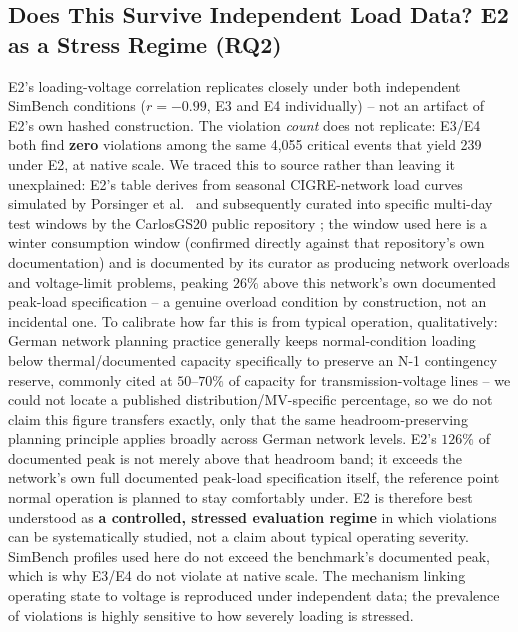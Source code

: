 \documentclass[11pt,conference]{IEEEtran}
\begin{document}
\subsection{Does This Survive Independent Load Data? E2 as a Stress Regime (RQ2)}
\label{sec:e2stress}
E2's loading-voltage correlation replicates closely under both independent SimBench conditions
($r=-0.99$, E3 and E4 individually) -- not an artifact of E2's own hashed construction. The
violation \textit{count} does not replicate: E3/E4 both find \textbf{zero} violations among the same
4,055 critical events that yield 239 under E2, at native scale. We traced this to source rather than
leaving it unexplained: E2's table derives from seasonal CIGRE-network load curves simulated by
Porsinger et al.\ \cite{ref:porsinger2017} and subsequently curated into specific multi-day test
windows by the CarlosGS20 public repository \cite{ref:carlosgs2020}; the window used here is a
winter consumption window (confirmed directly against that repository's own documentation) and is
documented by its curator as producing
network overloads and voltage-limit problems, peaking $26\%$ above this network's own documented
peak-load specification \cite{ref:rudion2006} -- a genuine overload condition by construction, not
an incidental one. To calibrate how far this is from typical operation, qualitatively: German
network planning practice generally keeps normal-condition loading below thermal/documented
capacity specifically to preserve an N-1 contingency reserve, commonly cited at $50$--$70\%$ of
capacity for transmission-voltage lines \cite{ref:kyon_n1} -- we could not locate a published
distribution/MV-specific percentage, so we do not claim this figure transfers exactly, only that the
same headroom-preserving planning principle applies broadly across German network levels. E2's
$126\%$ of documented peak is not merely above that headroom band; it exceeds the network's own
full documented peak-load specification itself, the reference point normal operation is planned to
stay comfortably under. E2 is therefore best understood as \textbf{a controlled, stressed evaluation
regime} in which violations can be systematically studied, not a claim about typical operating
severity. %
SimBench profiles used here do not exceed the benchmark's documented peak, which is why E3/E4 do not
violate at native scale. The mechanism linking operating state to voltage is reproduced under
independent data; the prevalence of violations is highly sensitive to how severely loading is
stressed.
\end{document}
